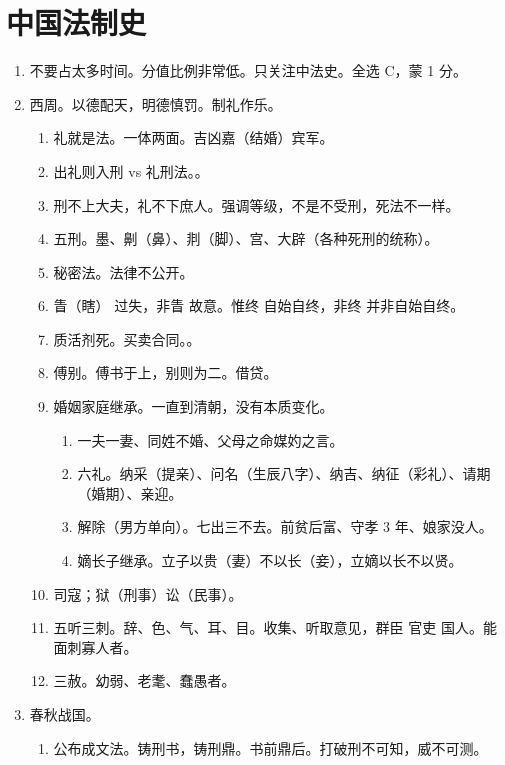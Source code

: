 \section{中国法制史}
\begin{enumerate}
  \item 不要占太多时间。分值比例非常低。只关注中法史。全选 C，蒙 1 分。
  \item 西周。以德配天，明德慎罚。制礼作乐。
        \begin{enumerate}
          \item 礼就是法。一体两面。吉凶嘉（结婚）宾军。
          \item 出礼则入刑 vs 礼刑法。。
          \item 刑不上大夫，礼不下庶人。强调等级，不是不受刑，死法不一样。
          \item 五刑。墨、劓（鼻）、剕（脚）、宫、大辟（各种死刑的统称）。
          \item 秘密法。法律不公开。
          \item 眚（瞎） \yjt 过失，非眚 \yjt 故意。惟终 \yjt 自始自终，非终 \yjt 并非自始自终。
          \item 质活剂死。买卖合同。。
          \item 傅别。傅书于上，别则为二。借贷。
          \item 婚姻家庭继承。一直到清朝，没有本质变化。
                \begin{enumerate}
                  \item 一夫一妻、同姓不婚、父母之命媒妁之言。
                  \item 六礼。纳采（提亲）、问名（生辰八字）、纳吉、纳征（彩礼）、请期（婚期）、亲迎。
                  \item 解除（男方单向）。七出三不去。前贫后富、守孝 3 年、娘家没人。
                  \item 嫡长子继承。立子以贵（妻）不以长（妾），立嫡以长不以贤。
                \end{enumerate}
          \item 司寇；狱（刑事）讼（民事）。
          \item 五听三刺。辞、色、气、耳、目。收集、听取意见，群臣 \yjt 官吏 \yjt 国人。能面刺寡人者。
          \item 三赦。幼弱、老耄、蠢愚者。
        \end{enumerate}
  \item 春秋战国。
        \begin{enumerate}
          \item 公布成文法。铸刑书，铸刑鼎。书前鼎后。打破刑不可知，威不可测。

\end{enumerate}
\end{enumerate}

